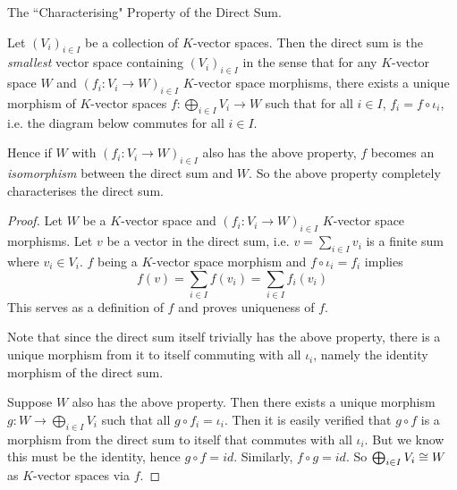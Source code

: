\documentclass[../../book.tex]{subfiles}
\begin{document}
\begin{thm} The ``Characterising" Property of the Direct Sum.
    
    Let $(V_i)_{i\in I}$ be a collection of $K$-vector spaces.
    Then the direct sum is the \emph{smallest} vector space 
    containing $(V_i)_{i\in I}$ in the sense that
    for any $K$-vector space $W$ and 
    $(f_i : V_i \to W)_{i\in I}$ $K$-vector space morphisms,
    there exists a unique morphism of $K$-vector spaces 
    $f : \bigoplus_{i\in I} V_i \to W$ such that for all $i\in I$, 
    $f_i = f \circ \iota_i$,
    i.e. the diagram below commutes for all $i \in I$.  
    \begin{figure} [ht]
        \centering
    \end{figure}

    
    Hence if $W$ with $(f_i : V_i \to W)_{i\in I}$ also has the above property,
    $f$ becomes an \emph{isomorphism} between the direct sum and $W$.
    So the above property completely characterises the direct sum. 
\end{thm}
\begin{proof}
    Let $W$ be a $K$-vector space and 
    $(f_i : V_i \to W)_{i\in I}$ $K$-vector space morphisms.
    Let $v$ be a vector in the direct sum, 
    i.e. $v = \sum_{i\in I} v_i$ is a finite sum where $v_i \in V_i$. 
    $f$ being a $K$-vector space morphism and $f \circ \iota_i = f_i$ implies \[
        f(v) = \sum_{i\in I} f(v_i) = \sum_{i\in I} f_i(v_i)
    \]
    This serves as a definition of $f$ and proves uniqueness of $f$. 
    
    Note that since the direct sum itself trivially has the above property, 
    there is a unique morphism from it to itself commuting with all $\iota_i$,
    namely the identity morphism of the direct sum. 
    
    Suppose $W$ also has the above property. 
    Then there exists a unique morphism $g : W \to \bigoplus_{i\in I} V_i$
    such that all $g \circ f_i = \iota_i$. 
    Then it is easily verified that $g \circ f$ is a morphism 
    from the direct sum to itself that commutes with all $\iota_i$.
    But we know this must be the identity, hence $g \circ f = id$. 
    Similarly, $f \circ g = id$. 
    So $\bigoplus_{i\in I} V_i \cong W$ as $K$-vector spaces via $f$. 
\end{proof}
\end{document}
